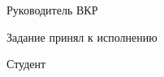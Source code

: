 \intervalS%

Руководитель ВКР \uline{\hrulefill}\Supervisor

\intervalS%


Задание принял к исполнению 

\intervalS%

Студент \uline{\hrulefill}\Author



